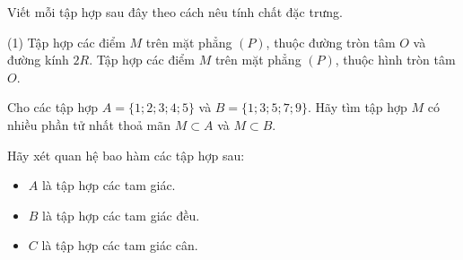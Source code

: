 \begin{bt}%
	Viết mỗi tập hợp sau đây theo cách nêu tính chất đặc trưng.
	\begin{tasks}(1)
		\task Tập hợp các điểm $M$ trên mặt phẳng $(P)$, thuộc đường tròn tâm $O$ và đường kính $2R$.
		\task Tập hợp các điểm $M$ trên mặt phẳng $(P)$, thuộc hình tròn tâm $O$.
	\end{tasks}
\end{bt}

\begin{bt}
	Cho các tập hợp $A=\{1 ; 2 ; 3 ; 4 ; 5\}$ và $B=\{1 ; 3 ; 5 ; 7 ; 9\}$. Hãy tìm tập hợp $M$ có nhiều phần tử nhất thoả mãn $M \subset A$ và $M \subset B$.
\end{bt}

\begin{bt} %
	Hãy xét quan hệ bao hàm các tập hợp sau:
	\begin{itemize}
		\item [] $A$ là tập hợp các tam giác.
		\item [] $B$ là tập hợp các tam giác đều.
		\item [] $C$ là tập hợp các tam giác cân.
	\end{itemize}
\end{bt}

